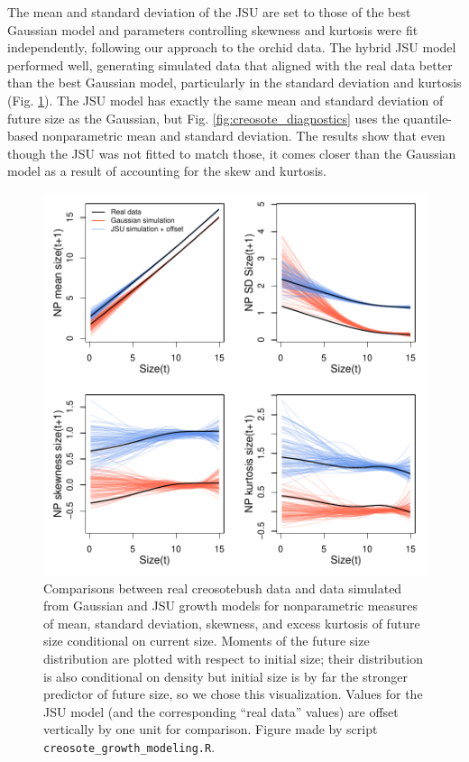 \documentclass[12pt]{article}
\begin{document}
The mean and standard deviation of the JSU are set to those of the best Gaussian model and parameters controlling skewness and kurtosis were fit independently, following our approach to the orchid data. 
The hybrid JSU model performed well, generating simulated data that aligned with the real data better than the best Gaussian model, particularly in the standard deviation and kurtosis (Fig. \ref{fig:creosote_JSU}). 
The JSU model has exactly the same mean and standard deviation of future size as the Gaussian, but Fig. \ref{fig:creosote_diagnostics} uses the quantile-based nonparametric mean and standard deviation. 
The results show that even though the JSU was not fitted to match those, it comes closer than the Gaussian model as a result of accounting for the skew and kurtosis.

\begin{figure}[tbp]
	\centering
	\includegraphics[width=1.0\textwidth]{figures/creosote_JSU_fit.pdf}
	\caption{Comparisons between real creosotebush data and data simulated from Gaussian and JSU growth models for nonparametric measures of mean, standard deviation, skewness, and excess kurtosis of future size conditional on current size. 
		Moments of the future size distribution are plotted with respect to initial size; their distribution is also conditional on density but initial size is by far the stronger predictor of future size, so we chose this visualization. 
		Values for the JSU model (and the corresponding ``real data'' values) are offset vertically by one unit for comparison. Figure made by script \texttt{creosote\_growth\_modeling.R}.}
	\label{fig:creosote_JSU}
\end{figure} 
\end{document}
